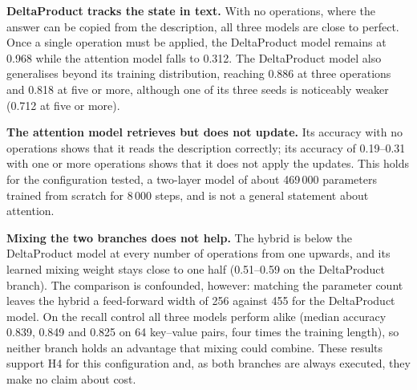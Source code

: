 \textbf{DeltaProduct tracks the state in text.} With no operations, where the answer can be copied from the description, all three models are close to perfect. Once a single operation must be applied, the DeltaProduct model remains at 0.968 while the attention model falls to 0.312. The DeltaProduct model also generalises beyond its training distribution, reaching 0.886 at three operations and 0.818 at five or more, although one of its three seeds is noticeably weaker (0.712 at five or more).

\textbf{The attention model retrieves but does not update.} Its accuracy with no operations shows that it reads the description correctly; its accuracy of 0.19--0.31 with one or more operations shows that it does not apply the updates. This holds for the configuration tested, a two-layer model of about 469\,000 parameters trained from scratch for 8\,000 steps, and is not a general statement about attention.

\textbf{Mixing the two branches does not help.} The hybrid is below the DeltaProduct model at every number of operations from one upwards, and its learned mixing weight stays close to one half (0.51--0.59 on the DeltaProduct branch). The comparison is confounded, however: matching the parameter count leaves the hybrid a feed-forward width of 256 against 455 for the DeltaProduct model. On the recall control all three models perform alike (median accuracy 0.839, 0.849 and 0.825 on 64 key--value pairs, four times the training length), so neither branch holds an advantage that mixing could combine. These results support H4 for this configuration and, as both branches are always executed, they make no claim about cost.

